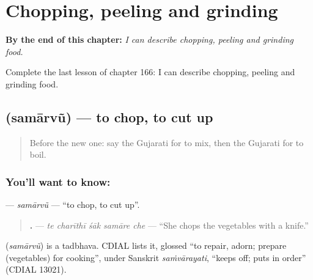 
\chapter{Chopping, peeling and grinding}
\label{ch:gu-chopping-peeling-and-grinding}

\begin{chapteropening}
\textbf{By the end of this chapter:} \emph{I can describe chopping, peeling and grinding food.}

Complete the last lesson of chapter 166: I can describe chopping, peeling and grinding food.
\end{chapteropening}

\section[\texorpdfstring{\gu{સમારવું} (samārvũ)}{સમારવું (samārvũ)}]{ (samārvũ) — to chop, to cut up}

\label{lesson:GU-C166-samarvu}



\begin{quote}
Before the new one: say the Gujarati for to mix, then the Gujarati for to boil.
\end{quote}

\subsection*{You'll want to know: }
\textbf{} — \emph{samārvũ} — \textquotedblleft{}to chop, to cut up\textquotedblright{}.

\begin{quote}
\textbf{    .} — \emph{te charīthī śāk samāre che} — \textquotedblleft{}She chops the vegetables with a knife.\textquotedblright{}
\end{quote}

\begin{cousinweb}
\textbf{} (\emph{samārvũ}) is a tadbhava. CDIAL lists it, glossed \textquotedblleft{}to repair, adorn; prepare (vegetables) for cooking\textquotedblright{}, under Sanskrit \emph{saṁvārayati}, \textquotedblleft{}keeps off; puts in order\textquotedblright{} (CDIAL 13021).
\end{cousinweb}

